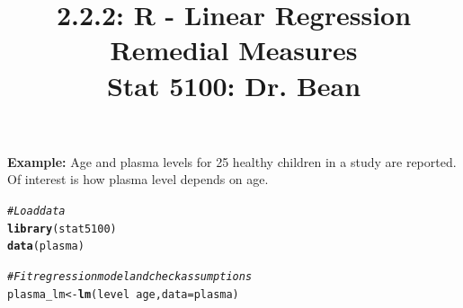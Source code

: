 \documentclass{article}\usepackage[]{graphicx}\usepackage[]{color}
\makeatletter
\newcommand{\hlcom}[1]{\textcolor[rgb]{0.678,0.584,0.686}{\textit{#1}}}%
\newcommand{\hlopt}[1]{\textcolor[rgb]{0,0,0}{#1}}%
\newcommand{\hlstd}[1]{\textcolor[rgb]{0.345,0.345,0.345}{#1}}%
\newcommand{\hlkwb}[1]{\textcolor[rgb]{0.69,0.353,0.396}{#1}}%
\newcommand{\hlkwc}[1]{\textcolor[rgb]{0.333,0.667,0.333}{#1}}%
\newcommand{\hlkwd}[1]{\textcolor[rgb]{0.737,0.353,0.396}{\textbf{#1}}}%
\newenvironment{kframe}{%
 \def\at@end@of@kframe{}%
 \ifinner\ifhmode%
  \def\at@end@of@kframe{\end{minipage}}%
  \begin{minipage}{\columnwidth}%
 \fi\fi%
 \def\FrameCommand##1{\hskip\@totalleftmargin \hskip-\fboxsep
 \colorbox{shadecolor}{##1}\hskip-\fboxsep
     \hskip-\linewidth \hskip-\@totalleftmargin \hskip\columnwidth}%
 \MakeFramed {\advance\hsize-\width
   \@totalleftmargin\z@ \linewidth\hsize
   \@setminipage}}%
 {\par\unskip\endMakeFramed%
 \at@end@of@kframe}
\newenvironment{knitrout}{}{} %
\makeatother
\begin{document}
\title{%
  2.2.2: R - Linear Regression Remedial Measures\\
  \smallskip
  \large Stat 5100: Dr. Bean
}
\date{}

\maketitle

\textbf{Example: } Age and plasma levels for 25 healthy children in a study are reported. Of interest is how plasma level depends on age.

\begin{knitrout}
\color{fgcolor}\begin{kframe}
\begin{alltt}
\hlcom{# Load data}
\hlkwd{library}\hlstd{(stat5100)}
\hlkwd{data}\hlstd{(plasma)}

\hlcom{# Fit regression model and check assumptions}
\hlstd{plasma_lm} \hlkwb{<-} \hlkwd{lm}\hlstd{(level} \hlopt{~} \hlstd{age,} \hlkwc{data} \hlstd{= plasma)}


\end{alltt}
\end{kframe}
\end{knitrout}
\end{document}
